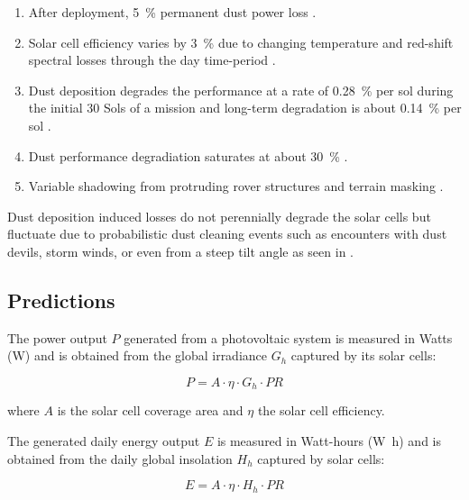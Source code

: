 \begin{enumerate}[label=\textcolor{BulletBlue}{(\alph*)}]
  \item\label{itm:pr:perm_loss}After deployment, \SI{5}{\percent} permanent dust power loss .
  \item\label{itm:pr:temp}Solar cell efficiency varies by \SI{3}{\percent} due to changing temperature and red-shift spectral losses through the day time-period .
  \item\label{itm:pr:deposition}Dust deposition degrades the performance at a rate of \SI{0.28}{\percent} per sol during the initial 30 Sols of a mission and long-term degradation is about \SI{0.14}{\percent} per sol .
  \item\label{itm:pr:saturation}Dust performance degradiation saturates at about \SI{30}{\percent} .
  \item\label{itm:pr:shadowing}Variable shadowing from protruding rover structures  and terrain masking .
\end{enumerate}

Dust deposition induced losses do not perennially degrade the solar cells but fluctuate due to probabilistic dust cleaning events such as encounters with dust devils, storm winds, or even from a steep tilt angle as seen in .

\subsection{Predictions}
\label{sec:PowerAndEnergyPredictions:Predictions}

The power output $P$ generated from a photovoltaic system is measured in Watts (\si{\watt}) and is obtained from the global irradiance $G_{h}$ captured by its solar cells:

\begin{equation}
  \label{eq:SA_power}
  P = A \cdot \eta \cdot G_{h} \cdot PR
\end{equation}

where $A$ is the solar cell coverage area and $\eta$ the solar cell efficiency.

The generated daily energy output $E$ is measured in Watt-hours (\si{\watt\hour}) and is obtained from the daily global insolation $H_{h}$ captured by solar cells:

\begin{equation}
  \label{eq:SA_energy}
  E = A \cdot \eta \cdot H_{h} \cdot PR
\end{equation}

